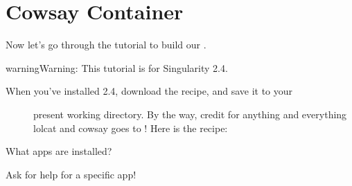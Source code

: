 \documentclass[letterpaper,10pt,english]{sphinxmanual}
\begin{document}
\section{Cowsay Container}
\label{\detokenize{reproducible_scif_apps:cowsay-container}}
Now let’s go through the tutorial to build our {\hyperref[\detokenize{reproducible_scif_apps:cowsay-container}]{}}.

\begin{sphinxadmonition}{warning}{Warning:}
 This tutorial is for Singularity 2.4.
\end{sphinxadmonition}
\begin{description}
\item[{When you’ve installed 2.4, download the recipe, and save it to your}] \leavevmode
present working directory. By the way, credit for anything and
everything lolcat and cowsay goes to ! Here is the recipe:

\end{description}

%
\begin{sphinxVerbatim}[commandchars=\\\{\}]
 

    
\end{sphinxVerbatim}

What apps are installed?

%
\begin{sphinxVerbatim}[commandchars=\\\{\}]
  



\end{sphinxVerbatim}

Ask for help for a specific app!

%
\begin{sphinxVerbatim}[commandchars=\\\{\}]
    

    
\end{sphinxVerbatim}
\end{document}
